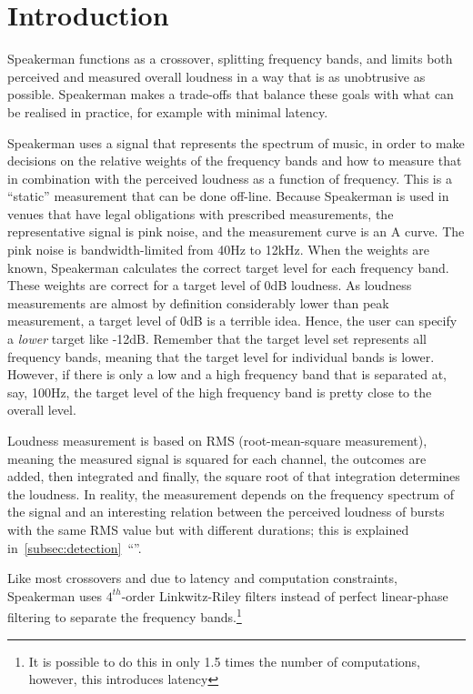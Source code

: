\documentclass[11pt]{article}
\begin{document}
\section{Introduction}\label{sec:introduction}

Speakerman functions as a crossover, splitting frequency bands, and limits both perceived and measured overall loudness in a way that is as unobtrusive as possible.
Speakerman makes a trade-offs that balance these goals with what can be realised in practice, for example with minimal latency.

Speakerman uses a signal that represents the spectrum of music, in order to make decisions on the relative weights of the frequency bands and how to measure that in combination with the perceived loudness as a function of frequency.
This is a ``static'' measurement that can be done off-line.
Because Speakerman is used in venues that have legal obligations with prescribed measurements, the representative signal is pink noise, and the measurement curve is an A curve.
The pink noise is bandwidth-limited from 40Hz to 12kHz.
When the weights are known, Speakerman calculates the correct target level for each frequency band.
These weights are correct for a target level of 0dB loudness.
As loudness measurements are almost by definition considerably lower than peak measurement, a target level of 0dB is a terrible idea.
Hence, the user can specify a \emph{lower}  target like -12dB.
Remember that the target level set represents all frequency bands, meaning that the target level for individual bands is lower.
However, if there is only a low and a high frequency band that is separated at, say, 100Hz, the target level of the high frequency band is pretty close to the overall level.

Loudness measurement is based on RMS (root-mean-square measurement), meaning the measured signal is squared for each channel, the outcomes are added, then integrated and finally, the square root of that integration determines the loudness.
In reality, the measurement depends on the frequency spectrum of the signal and an interesting relation between the perceived loudness of bursts with the same RMS value but with different durations; this is explained in~\ref{subsec:detection}~``''.

Like most crossovers and due to latency and computation constraints, Speakerman uses $4^{th}$-order Linkwitz-Riley filters instead of perfect linear-phase filtering to separate the frequency bands.\footnote{It is possible to do this in only 1.5 times the number of computations, however, this introduces latency}
\end{document}
